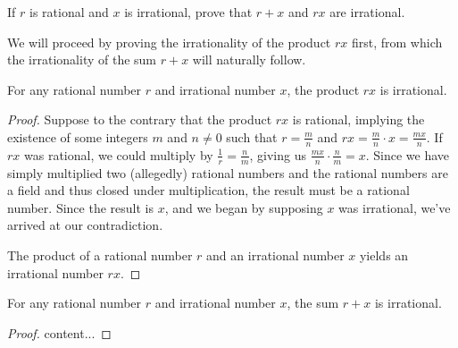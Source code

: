 \begin{exercise}
	If $r$ is rational and $x$ is irrational, prove that $r + x$ and $rx$ are irrational.
\end{exercise}

We will proceed by proving the irrationality of the product $rx$ first, from which the irrationality of the sum $r + x$ will naturally follow.

\begin{proposition}
	For any rational number $r$ and irrational number $x$, the product $rx$ is irrational.
\end{proposition}
\begin{proof}
	Suppose to the contrary that the product $rx$ is rational, implying the existence of some integers $m$ and $n \neq 0$ such that $r = \frac{m}{n}$ and $rx = \frac{m}{n} \cdot x = \frac{mx}{n}$. If $rx$ was rational, we could multiply by $\frac{1}{r} = \frac{n}{m}$, giving us $\frac{mx}{n} \cdot \frac{n}{m} = x$. Since we have simply multiplied two (allegedly) rational numbers and the rational numbers are a field and thus closed under multiplication, the result must be a rational number. Since the result is $x$, and we began by supposing $x$ was irrational, we've arrived at our contradiction.
	
	The product of a rational number $r$ and an irrational number $x$ yields an irrational number $rx$. 
\end{proof}

\begin{proposition}
	For any rational number $r$ and irrational number $x$, the sum $r + x$ is irrational.
\end{proposition}
\begin{proof}
	content...
\end{proof}

